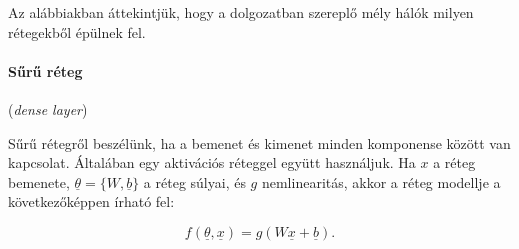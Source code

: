 Az alábbiakban áttekintjük, hogy a dolgozatban szereplő mély hálók milyen rétegekből épülnek fel.


\paragraph{Sűrű réteg} (\textit{dense layer}) 


Sűrű rétegről beszélünk, ha a bemenet és kimenet minden komponense között van kapcsolat. Általában egy aktivációs réteggel együtt használjuk. Ha $ x $ a réteg bemenete, $ \underline{\theta} = \{W, \underline{b}\} $ a réteg súlyai, és $ g $ nemlinearitás, akkor a réteg modellje a következőképpen írható fel:


\[  
f(\underline{\theta}, \underline{x}) = g(W \underline{x} + \underline{b}) .
\]


